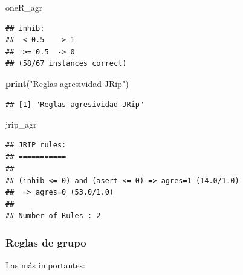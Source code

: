 \documentclass[]{article}
\newenvironment{Shaded}{\begin{snugshade}}{\end{snugshade}}
\newcommand{\KeywordTok}[1]{\textcolor[rgb]{0.13,0.29,0.53}{\textbf{#1}}}
\newcommand{\StringTok}[1]{\textcolor[rgb]{0.31,0.60,0.02}{#1}}
\newcommand{\NormalTok}[1]{#1}
\begin{document}
\begin{Shaded}
\begin{Highlighting}[]
\NormalTok{oneR_agr}
\end{Highlighting}
\end{Shaded}

\begin{verbatim}
## inhib:
##  < 0.5   -> 1
##  >= 0.5  -> 0
## (58/67 instances correct)
\end{verbatim}

\begin{Shaded}
\begin{Highlighting}[]
\KeywordTok{print}\NormalTok{(}\StringTok{"Reglas agresividad JRip"}\NormalTok{)}
\end{Highlighting}
\end{Shaded}

\begin{verbatim}
## [1] "Reglas agresividad JRip"
\end{verbatim}

\begin{Shaded}
\begin{Highlighting}[]
\NormalTok{jrip_agr}
\end{Highlighting}
\end{Shaded}

\begin{verbatim}
## JRIP rules:
## ===========
## 
## (inhib <= 0) and (asert <= 0) => agres=1 (14.0/1.0)
##  => agres=0 (53.0/1.0)
## 
## Number of Rules : 2
\end{verbatim}

\subsubsection{Reglas de grupo}\label{reglas-de-grupo}

Las más importantes:
\end{document}
